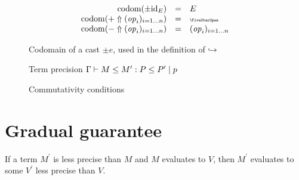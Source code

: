 \begin{figure}
\[
\begin{array}{rcl}
  \codom{\pm \effid_E} & = & E \\
  \codom{+ \Uparrow \fori{i}{n}{\effop_i}} & = & \effany \\
  \codom{- \Uparrow \fori{i}{n}{\effop_i}} & = & \fori{i}{n}{\effop_i}
\end{array}
\]
\caption{Codomain of a cast $\pm e$, used in the definition of $\stepperform$}
\end{figure}

\begin{figure}
\begin{prooftree}
\end{prooftree}
\begin{prooftree}
\end{prooftree}
\caption{Term precision $\TermP{\Gamma}{M}{P}{M^\prime}{P^\prime}{p}$}
\end{figure}

\begin{figure}
\begin{prooftree}
\end{prooftree}
\begin{prooftree}
\end{prooftree}
\begin{prooftree}
\end{prooftree}
\begin{prooftree}
\end{prooftree}
\caption{Commutativity conditions}
\end{figure}

\clearpage

\section{Gradual guarantee}

If a term $M^\prime$ is less precise than $M$ and $M$ evaluates to $V$,
then $M^\prime$ evaluates to some $V^\prime$ less precise than $V$.

